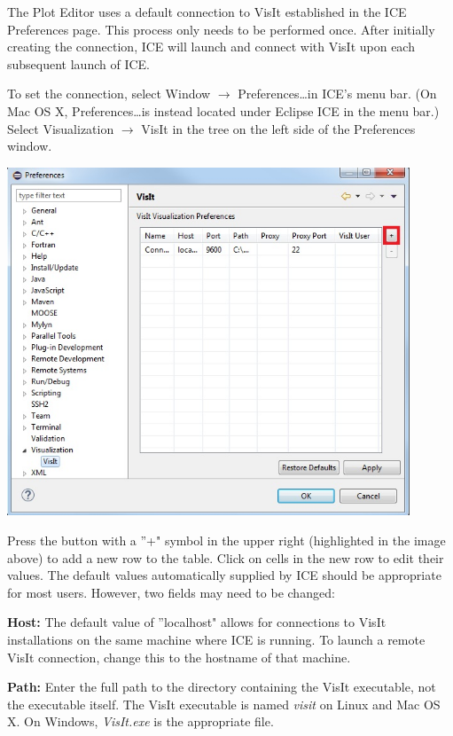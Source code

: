 \documentclass{article}
\begin{document}
The Plot Editor uses a default connection to VisIt established in the ICE
Preferences page. This process only needs to be performed once. After initially
creating the connection, ICE will launch and connect with VisIt upon each
subsequent launch of ICE.

To set the connection, select Window $\rightarrow$ Preferences\ldots in ICE's
menu bar. (On Mac OS X, Preferences\ldots is instead located under Eclipse
ICE in the menu bar.) Select Visualization $\rightarrow$ VisIt
in the tree on the left side of the Preferences window.

\begin{center}
\includegraphics[width=12cm]{images/VisItPreferencePage_ICE}
\end{center}

Press the button with a ''+" symbol in the upper right (highlighted in the image
above) to add a new row to the table. Click on cells in the new row to edit
their values. The default values automatically supplied by ICE should be
appropriate for most users. However, two fields may need to be changed:

\textbf{Host:} The default value of ''localhost" allows for connections to VisIt
installations on the same machine where ICE is running. To launch a remote VisIt
connection, change this to the hostname of that machine.

\textbf{Path:} Enter the full path to the directory containing the VisIt
executable, not the executable itself. The VisIt executable is named
\textit{visit} on Linux and Mac OS X. On Windows, \textit{VisIt.exe} is the
appropriate file.
\end{document}

